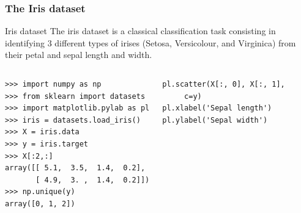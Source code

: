 \documentclass[10pt, colorlinks]{beamer}
\begin{document}
\begin{frame}[fragile]\frametitle{The Iris dataset}
\begin{block}{Iris dataset}
The iris dataset is a classical classification task consisting in identifying 3 different types of irises (Setosa, Versicolour, and Virginica) from their petal and sepal length and width.
\end{block}
\begin{columns}[c]
\small
\begin{verbatim}
>>> import numpy as np
>>> from sklearn import datasets
>>> import matplotlib.pylab as pl
>>> iris = datasets.load_iris()
>>> X = iris.data
>>> y = iris.target
>>> X[:2,:]
array([[ 5.1,  3.5,  1.4,  0.2],
       [ 4.9,  3. ,  1.4,  0.2]])
>>> np.unique(y)
array([0, 1, 2])
\end{verbatim}

\begin{verbatim}
pl.scatter(X[:, 0], X[:, 1],
     c=y)
pl.xlabel('Sepal length')
pl.ylabel('Sepal width')
\end{verbatim}

\end{columns}
\end{frame}
\end{document}

